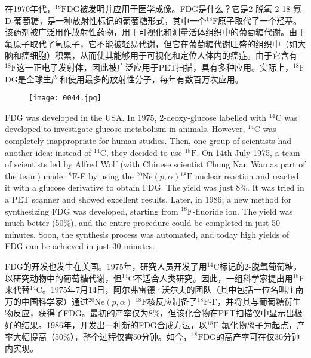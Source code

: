 \documentclass[dvipsnames, svgnames,a4paper,11pt]{article}
\begin{document}
在1970年代，${}^\text{18}\text{F}$DG被发明并应用于医学成像。FDG是什么？它是2-脱氧-2-18-氟-D-葡萄糖，是一种放射性标记的葡萄糖形式，其中一个${}^\text{18}\text{F}$原子取代了一个羟基。该药剂被广泛用作放射性药物，用于可视化和测量活体组织中的葡萄糖代谢。由于氟原子取代了氧原子，它不能被轻易代谢，但它在葡萄糖代谢旺盛的组织中（如大脑和癌细胞）积累，从而使其能够用于可视化和定位人体内的癌症。由于它含有${}^\text{18}\text{F}$这一正电子发射体，因此被广泛应用于PET扫描，具有多种应用。实际上，${}^\text{18}\text{F}$DG是全球生产和使用最多的放射性分子，每年有数百万次应用。

\begin{figure}[H]
      \centering
      \texttt{[image: 0044.jpg]}
       \label{fig37}
\end{figure}

FDG was developed in the USA. In 1975, 2-deoxy-glucose labelled with \(\mathrm{^{14}C}\) was developed to investigate glucose metabolism in animals. However, \(\mathrm{^{14}C}\) was completely inappropriate for human studies. Then, one group of scientists had another idea: instead of \(\mathrm{^{14}C}\), they decided to use \(\mathrm{^{18}F}\). On 14th July 1975, a team of scientists led by Alfred Wolf (with Chinese scientist Chung Nan Wan as part of the team) made \(\mathrm{^{18}F}\)-F by using the \(\mathrm{^{20}Ne} (p, \alpha)\mathrm{^{18}F}\) nuclear reaction and reacted it with a glucose derivative to obtain FDG. The yield was just 8\%. It was tried in a PET scanner and showed excellent results. Later, in 1986, a new method for synthesizing FDG was developed, starting from \(\mathrm{^{18}F}\)-fluoride ion. The yield was much better (50\%), and the entire procedure could be completed in just 50 minutes. Soon, the synthesis process was automated, and today high yields of FDG can be achieved in just 30 minutes.  

FDG的开发也发生在美国。1975年，研究人员开发了用${}^\text{14}\text{C}$标记的2-脱氧葡萄糖，以研究动物中的葡萄糖代谢，但${}^\text{14}\text{C}$不适合人类研究。因此，一组科学家提出用${}^\text{18}\text{F}$来代替${}^\text{14}\text{C}$。1975年7月14日，阿尔弗雷德·沃尔夫的团队（其中包括一位名叫庄南万的中国科学家）通过${}^\text{20}\text{Ne} (p, \alpha)$ ${}^\text{18}\text{F}$核反应制备了${}^\text{18}\text{F}$-F，并将其与葡萄糖衍生物反应，获得了FDG。最初的产率仅为8\%，但该化合物在PET扫描仪中显示出极好的结果。1986年，开发出一种新的FDG合成方法，以${}^\text{18}\text{F}$-氟化物离子为起点，产率大幅提高（50\%），整个过程仅需50分钟。如今，${}^\text{18}\text{F}$DG的高产率可在仅30分钟内实现。
\end{document}
